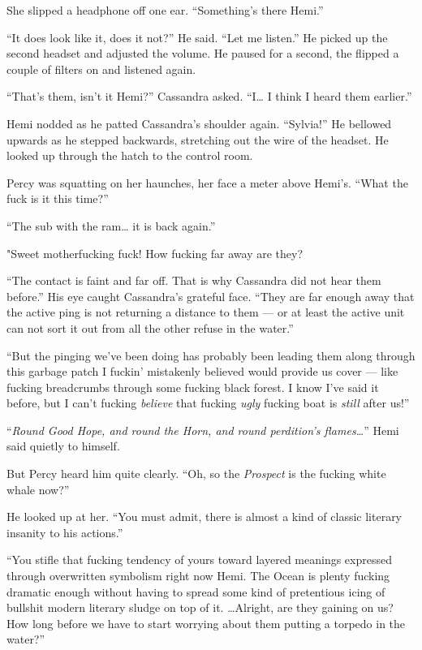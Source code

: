 \documentclass[]{scrbook}
\begin{document}
She slipped a headphone off one ear. ``Something's there Hemi.''

``It does look like it, does it not?'' He said. ``Let me listen.'' He
picked up the second headset and adjusted the volume. He paused for a
second, the flipped a couple of filters on and listened again.

``That's them, isn't it Hemi?'' Cassandra asked. ``I\ldots{} I think I
heard them earlier.''

Hemi nodded as he patted Cassandra's shoulder again. ``Sylvia!'' He
bellowed upwards as he stepped backwards, stretching out the wire of the
headset. He looked up through the hatch to the control room.

Percy was squatting on her haunches, her face a meter above Hemi's.
``What the fuck is it this time?''

``The sub with the ram\ldots{} it is back again.''

"Sweet motherfucking fuck! How fucking far away are they?

``The contact is faint and far off. That is why Cassandra did not hear
them before.'' His eye caught Cassandra's grateful face. ``They are far
enough away that the active ping is not returning a distance to them ---
or at least the active unit can not sort it out from all the other
refuse in the water.''

``But the pinging we've been doing has probably been leading them along
through this garbage patch I fuckin' mistakenly believed would provide
us cover --- like fucking breadcrumbs through some fucking black forest.
I know I've said it before, but I can't fucking \emph{believe} that
fucking \emph{ugly} fucking boat is \emph{still} after us!''

``\emph{Round Good Hope, and round the Horn, and round perdition's
flames\ldots{}}'' Hemi said quietly to himself.

But Percy heard him quite clearly. ``Oh, so the \emph{Prospect} is the
fucking white whale now?''

He looked up at her. ``You must admit, there is almost a kind of classic
literary insanity to his actions.''

``You stifle that fucking tendency of yours toward layered meanings
expressed through overwritten symbolism right now Hemi. The Ocean is
plenty fucking dramatic enough without having to spread some kind of
pretentious icing of bullshit modern literary sludge on top of it.
\ldots{}Alright, are they gaining on us? How long before we have to
start worrying about them putting a torpedo in the water?''
\end{document}
